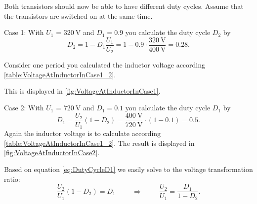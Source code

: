 \vspace{2em}\par
Both transistors should now be able to have different duty cycles. Assume that the transistors are switched on at the same time.


\begin{solutionblock}
    Case 1: With $U_\mathrm{1}$ = $\SI{320}{\volt}$ and $D_1 = 0.9$ you calculate the duty cycle $D_2$ by
    \begin{equation}
        D_2 = 1 - D_1 \frac{U_\mathrm{1}}{U_\mathrm{2}} = 1 - 0.9 \cdot \frac{\SI{320}{\volt}}{\SI{400}{\volt}}= 0.28.
    \end{equation}

    Consider one period you calculated the inductor voltage according \autoref{table:VoltageAtInductorInCase1_2}.
    
    This is displayed in \autoref{fig:VoltageAtInductorInCase1}.
    

    
    Case 2: With $U_\mathrm{1}$ = $\SI{720}{\volt}$ and $D_1 = 0.1$ you calculate the duty cycle $D_1$ by
    \begin{equation}
        D_1 = \frac{U_\mathrm{2}}{U_\mathrm{1}} \left(1 - D_2 \right)= \frac{\SI{400}{\volt}}{\SI{720}{\volt}} \cdot \left(1 - 0.1\right) = 0.5.
        \label{eq:DutyCycleD1}
    \end{equation}
    Again the inductor voltage is to calculate according \autoref{table:VoltageAtInductorInCase1_2}.
    The result is displayed in \autoref{fig:VoltageAtInductorInCase2}.

    
        
\end{solutionblock}

\begin{solutionblock}
    Based on equation \eqref{eq:DutyCycleD1} we easily solve to the voltage transformation ratio:
    \begin{equation}
        \frac{U_\mathrm{2}}{U_\mathrm{1}} \left(1 - D_2 \right) = D_1 
        \hspace{1cm} \Rightarrow \hspace{1cm}
        \frac{U_\mathrm{2}}{U_\mathrm{1}} = \frac{D_1} {1-D_2}.
    \end{equation}
\end{solutionblock}


